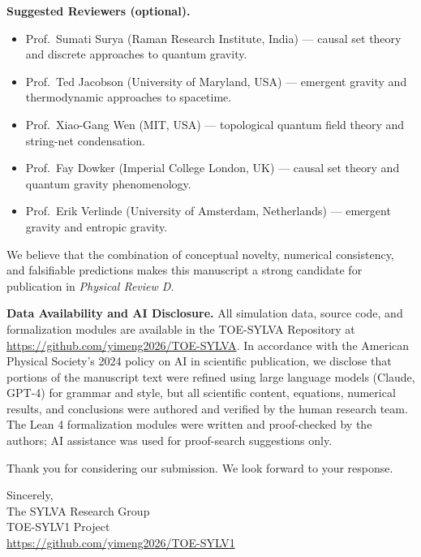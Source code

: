 \textbf{Suggested Reviewers (optional).}
\begin{itemize}
\item Prof.~Sumati Surya (Raman Research Institute, India) --- causal set theory and discrete approaches to quantum gravity.
\item Prof.~Ted Jacobson (University of Maryland, USA) --- emergent gravity and thermodynamic approaches to spacetime.
\item Prof.~Xiao-Gang Wen (MIT, USA) --- topological quantum field theory and string-net condensation.
\item Prof.~Fay Dowker (Imperial College London, UK) --- causal set theory and quantum gravity phenomenology.
\item Prof.~Erik Verlinde (University of Amsterdam, Netherlands) --- emergent gravity and entropic gravity.
\end{itemize}

We believe that the combination of conceptual novelty, numerical consistency, and falsifiable predictions makes this manuscript a strong candidate for publication in \textit{Physical Review D}.

\textbf{Data Availability and AI Disclosure.}
All simulation data, source code, and formalization modules are available in the TOE-SYLVA Repository at \url{https://github.com/yimeng2026/TOE-SYLVA}. In accordance with the American Physical Society's 2024 policy on AI in scientific publication, we disclose that portions of the manuscript text were refined using large language models (Claude, GPT-4) for grammar and style, but all scientific content, equations, numerical results, and conclusions were authored and verified by the human research team. The Lean 4 formalization modules were written and proof-checked by the authors; AI assistance was used for proof-search suggestions only.

Thank you for considering our submission. We look forward to your response.

\vspace{1em}
\noindent
Sincerely,\\
The SYLVA Research Group\\
TOE-SYLV1 Project\\
\url{https://github.com/yimeng2026/TOE-SYLV1}
